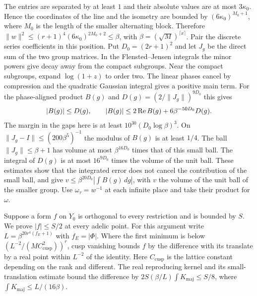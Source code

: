 The entries are separated by at least \(1\) and their absolute values
are at most \(3\kappa_0\). Hence the coordinates of the line and the
isometry are bounded by \((6\kappa_0)^{M_0+1}\), where \(M_0\) is the
length of the smaller alternating block. Therefore
\(\|w\|^2\le(r+1)^4(6\kappa_0)^{2M_0+2}\le\beta\), with
\(\beta=(\sqrt M)^{\lceil x\rceil}\).
Pair the discrete series coefficients in this position.
Put \(D_0=(2r+1)^2\) and let \(J_g\) be the direct sum of the two group
matrices. In the Flensted--Jensen integrals the minor powers give decay
away from the compact subgroups. Near the compact subgroups, expand
\(\log(1+z)\) to order two. The linear phases cancel by compression
and the quadratic Gaussian integral gives a positive main term.
For the phase-aligned product \(B(g)\) and
\(D(g)=(2/\|J_g\|)^{9D_0}\) this gives
\[
 |B(g)|\le D(g),\qquad
 |B(g)|\le 2\operatorname{Re} B(g)+6\beta^{-50D_0}D(g).
\]
The margin in the gaps here is at least \(10^{30}(D_0\log\beta)^3\).
On \(\|J_g-I\|\le(200\beta^5)^{-1}\) the modulus of \(B(g)\) is at
least \(1/4\). The ball \(\|J_g\|\le\beta+1\) has volume at most
\(\beta^{16D_0}\) times that of this small ball. The integral of
\(D(g)\) is at most \(16^{9D_0}\) times the volume of the unit ball.
These estimates show that the integrated error does not cancel
the contribution of the small ball, and give
\(v\le\beta^{20D_0}|\int B(g)\,dg|\), with \(v\) the volume of the
unit ball of the smaller group. Use \(\omega_\tau=w^{-1}\) at each
infinite place and take their product for \(\omega\).

Suppose a form \(f\) on \(Y_0\) is orthogonal to every restriction
and is bounded by \(S\). We prove \(|f|\le S/2\) at every adelic point.
For this argument write \(L=\beta^{20r^4(f_E+1)}\) with \(f_E=|\Phi|\).
Where the first minimum is below
\((L^{-2}/(M C_{\mathrm{cusp}}^2))^r\), cusp vanishing bounds \(f\)
by the difference with its translate by a real point within \(L^{-2}\)
of the identity. Here \(C_{\mathrm{cusp}}\) is the lattice constant
depending on the rank and different. The real reproducing kernel
and its small-translation estimate bound the difference by
\(2S(\beta/L)\int K_\mathrm{maj}\le S/8\), where
\(\int K_\mathrm{maj}\le L/(16\beta)\).

